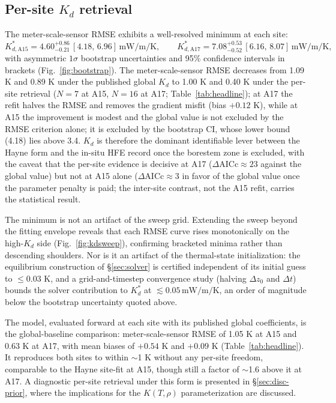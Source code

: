 \documentclass[11pt]{article}
\begin{document}
\label{sec:headline-table}

\subsection{Per-site $K_d$ retrieval}\label{sec:results-kd}
The meter-scale-sensor RMSE exhibits a well-resolved
minimum at each site:
\[
K_{d,\mathrm{A15}}^{*}=4.60^{+0.86}_{-0.21}\,[4.18,\,6.96]\,\si{\milli\watt\per\meter\per\kelvin},\qquad
K_{d,\mathrm{A17}}^{*}=7.08^{+0.53}_{-0.52}\,[6.16,\,8.07]\,\si{\milli\watt\per\meter\per\kelvin},
\]
with asymmetric $1\sigma$ bootstrap uncertainties and 95\% confidence
intervals in brackets (Fig.~\ref{fig:bootstrap}). The
meter-scale-sensor RMSE decreases from
1.09 K and 0.89 K under the published
global $K_d$ to 1.00 K and 0.40 K under the
per-site retrieval ($N=7$ at A15, $N=16$ at A17;
Table~\ref{tab:headline}); at A17 the refit halves the RMSE and removes the
gradient misfit (bias $+0.12$ K), while at A15 the improvement is
modest and the global value is not excluded by the RMSE criterion
alone; it is excluded by the bootstrap CI, whose lower bound
(4.18) lies above 3.4.
$K_d$ is therefore the dominant identifiable lever between the Hayne form
and the in-situ HFE record once the borestem zone is excluded,
with the caveat that the per-site evidence is decisive at A17
($\Delta\mathrm{AICc}\approx 23$ against the global value) but not at
A15 alone ($\Delta\mathrm{AICc}\approx 3$ in favor of the
global value once the parameter penalty is paid; the inter-site
contrast, not the A15 refit, carries the statistical result.

The minimum is not an artifact of the sweep grid. Extending the sweep
beyond the fitting envelope reveals that each RMSE curve rises
monotonically on the high-$K_d$ side (Fig.~\ref{fig:kdsweep}), confirming
bracketed minima rather than descending shoulders. Nor is it an
artifact of the thermal-state initialization: the equilibrium
construction of \S\ref{sec:solver} is certified independent of its
initial guess to $\le 0.03$ K, and a grid-and-timestep convergence study
(halving $\Delta z_0$ and $\Delta t$) bounds the solver contribution to
$K_d^{*}$ at $\lesssim 0.05\,\si{\milli\watt\per\meter\per\kelvin}$,
an order of magnitude below the bootstrap uncertainty quoted above.

The \citet{martinez2021} model, evaluated forward at each site with its
published global coefficients, is the global-baseline comparison:
meter-scale-sensor RMSE of 1.05 K
at A15 and 0.63 K at A17, with mean biases of $+0.54$ K and $+0.09$ K
(Table~\ref{tab:headline}). It reproduces
both sites to within $\sim$1 K without any per-site freedom,
comparable to the Hayne site-fit at A15, though still a factor of
$\sim$1.6 above it at A17. A diagnostic per-site retrieval under
this form is presented in \S\ref{sec:disc-prior}, where the implications
for the $K(T,\rho)$ parameterization are discussed.
\end{document}
